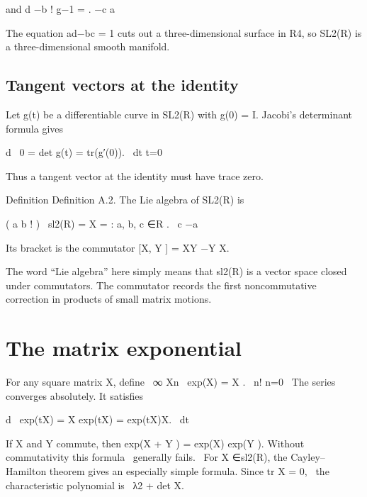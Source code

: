 and d −b ! g−1 = . −c a


The equation ad−bc = 1 cuts out a three-dimensional surface in R4, so SL2(R) is a three-dimensional smooth manifold.


\subsection{Tangent vectors at the identity}

Let g(t) be a differentiable curve in SL2(R) with g(0) = I. Jacobi’s determinant formula gives


\begin{displaytext}
d \
0 = det g(t) = tr(g′(0)). \
dt t=0
\end{displaytext}

Thus a tangent vector at the identity must have trace zero.


\begin{statementbox}{Definition}
Definition A.2. The Lie algebra of SL2(R) is
\end{statementbox}

\begin{displaytext}
( a b ! ) \
sl2(R) = X = : a, b, c ∈R . \
c −a
\end{displaytext}

Its bracket is the commutator [X, Y ] = XY −Y X.


The word “Lie algebra” here simply means that sl2(R) is a vector space closed under commutators. The commutator records the first noncommutative correction in products of small matrix motions.


\section{The matrix exponential}

\begin{displaytext}
For any square matrix X, define \
∞ Xn \
exp(X) = X . \
n! n=0 \
The series converges absolutely. It satisfies
\end{displaytext}

\begin{displaytext}
d \
exp(tX) = X exp(tX) = exp(tX)X. \
dt
\end{displaytext}

\begin{displaytext}
If X and Y commute, then exp(X + Y ) = exp(X) exp(Y ). Without commutativity this formula \
generally fails. \
For X ∈sl2(R), the Cayley–Hamilton theorem gives an especially simple formula. Since tr X = 0, \
the characteristic polynomial is \
λ2 + det X.
\end{displaytext}

